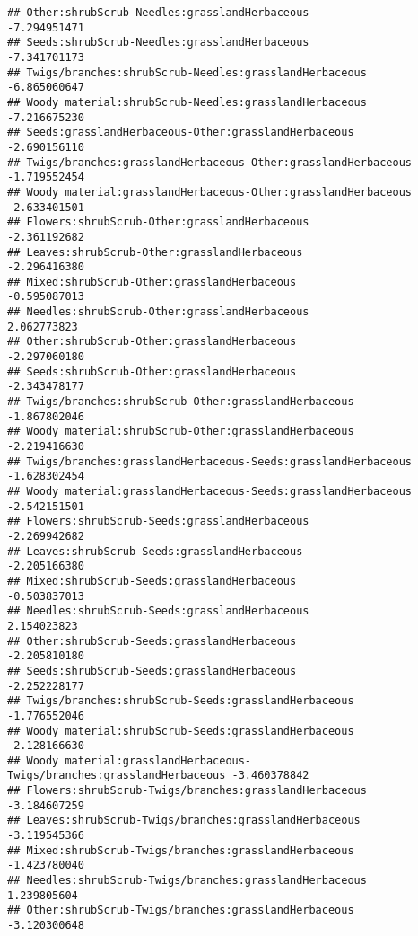 \documentclass[
]{article}
\begin{document}
\begin{verbatim}
## Other:shrubScrub-Needles:grasslandHerbaceous                          -7.294951471
## Seeds:shrubScrub-Needles:grasslandHerbaceous                          -7.341701173
## Twigs/branches:shrubScrub-Needles:grasslandHerbaceous                 -6.865060647
## Woody material:shrubScrub-Needles:grasslandHerbaceous                 -7.216675230
## Seeds:grasslandHerbaceous-Other:grasslandHerbaceous                   -2.690156110
## Twigs/branches:grasslandHerbaceous-Other:grasslandHerbaceous          -1.719552454
## Woody material:grasslandHerbaceous-Other:grasslandHerbaceous          -2.633401501
## Flowers:shrubScrub-Other:grasslandHerbaceous                          -2.361192682
## Leaves:shrubScrub-Other:grasslandHerbaceous                           -2.296416380
## Mixed:shrubScrub-Other:grasslandHerbaceous                            -0.595087013
## Needles:shrubScrub-Other:grasslandHerbaceous                           2.062773823
## Other:shrubScrub-Other:grasslandHerbaceous                            -2.297060180
## Seeds:shrubScrub-Other:grasslandHerbaceous                            -2.343478177
## Twigs/branches:shrubScrub-Other:grasslandHerbaceous                   -1.867802046
## Woody material:shrubScrub-Other:grasslandHerbaceous                   -2.219416630
## Twigs/branches:grasslandHerbaceous-Seeds:grasslandHerbaceous          -1.628302454
## Woody material:grasslandHerbaceous-Seeds:grasslandHerbaceous          -2.542151501
## Flowers:shrubScrub-Seeds:grasslandHerbaceous                          -2.269942682
## Leaves:shrubScrub-Seeds:grasslandHerbaceous                           -2.205166380
## Mixed:shrubScrub-Seeds:grasslandHerbaceous                            -0.503837013
## Needles:shrubScrub-Seeds:grasslandHerbaceous                           2.154023823
## Other:shrubScrub-Seeds:grasslandHerbaceous                            -2.205810180
## Seeds:shrubScrub-Seeds:grasslandHerbaceous                            -2.252228177
## Twigs/branches:shrubScrub-Seeds:grasslandHerbaceous                   -1.776552046
## Woody material:shrubScrub-Seeds:grasslandHerbaceous                   -2.128166630
## Woody material:grasslandHerbaceous-Twigs/branches:grasslandHerbaceous -3.460378842
## Flowers:shrubScrub-Twigs/branches:grasslandHerbaceous                 -3.184607259
## Leaves:shrubScrub-Twigs/branches:grasslandHerbaceous                  -3.119545366
## Mixed:shrubScrub-Twigs/branches:grasslandHerbaceous                   -1.423780040
## Needles:shrubScrub-Twigs/branches:grasslandHerbaceous                  1.239805604
## Other:shrubScrub-Twigs/branches:grasslandHerbaceous                   -3.120300648

\end{verbatim}
\end{document}
